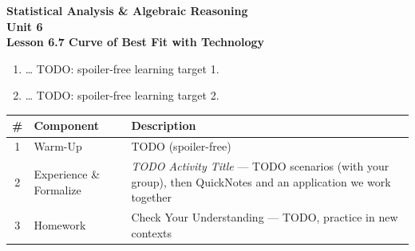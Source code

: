 \documentclass[10pt]{article}
\begin{document}
\vspace{-0.8in}

\begin{center}
  {\color{white}\textbf{\LARGE Statistical Analysis \& Algebraic Reasoning}}\\[4pt]
  {\color{frostmid}\large\textbf{Unit 6}}\\[6pt]
  {\color{white}\textbf{\large Lesson 6.7 \quad Curve of Best Fit with Technology}}
\end{center}

\vspace{0.22in}
\namedateperiod
\vspace{0.18in}

\begin{learningtargetbox}
\small
\begin{enumerate}[leftmargin=1.5em, itemsep=5pt]
  \item \ldots{} TODO: spoiler-free learning target 1.
  \item \ldots{} TODO: spoiler-free learning target 2.
\end{enumerate}
\end{learningtargetbox}

\vspace{0.14in}

\begin{tocbox}
\small
\renewcommand{\arraystretch}{1.5}
\begin{tabularx}{\linewidth}{@{} c l X @{}}
\rowcolor{frost}
\textbf{\#} & \textbf{Component} & \textbf{Description} \\
\midrule
1 & Warm-Up    & TODO (spoiler-free) \\
2 & Experience \& Formalize & \emph{TODO Activity Title} --- TODO scenarios (with your group),
                 then QuickNotes and an application we work together \\
3 & Homework   & Check Your Understanding --- TODO, practice in new contexts \\
\end{tabularx}
\end{tocbox}
\end{document}
